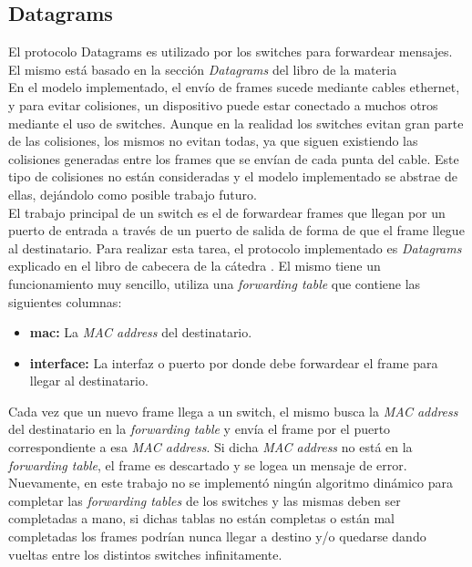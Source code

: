 \documentclass[10pt,a4paper]{article}
\begin{document}
\subsection{Datagrams}
El protocolo Datagrams es utilizado por los switches para forwardear mensajes. El mismo está basado en la sección \textit{Datagrams} del libro de la materia \cite[p.~172]{peterson2011computer} \\

En el modelo implementado, el envío de frames sucede mediante cables ethernet, y para evitar colisiones, un dispositivo puede estar conectado a muchos otros mediante el uso de switches. Aunque en la realidad los switches evitan gran parte de las colisiones, los mismos no evitan todas, ya que siguen existiendo las colisiones generadas entre los frames que se envían de cada punta del cable. Este tipo de colisiones no están consideradas y el modelo implementado se abstrae de ellas, dejándolo como posible trabajo futuro. \\

El trabajo principal de un switch es el de forwardear frames que llegan por un puerto de entrada a través de un puerto de salida de forma de que el frame llegue al destinatario. Para realizar esta tarea, el protocolo implementado es \textit{Datagrams} explicado en el libro de cabecera de la cátedra \cite[p.~172]{peterson2011computer}. El mismo tiene un funcionamiento muy sencillo, utiliza una \textit{forwarding table} que contiene las siguientes columnas: \\

\begin{itemize}
\item \textbf{mac: } La \textit{MAC address} del destinatario.
\item \textbf{interface: } La interfaz o puerto por donde debe forwardear el frame para llegar al destinatario.
\end{itemize}

Cada vez que un nuevo frame llega a un switch, el mismo busca la \textit{MAC address} del destinatario en la \textit{forwarding table} y envía el frame por el puerto correspondiente a esa \textit{MAC address}. Si dicha \textit{MAC address} no está en la \textit{forwarding table}, el frame es descartado y se logea un mensaje de error. \\

Nuevamente, en este trabajo no se implementó ningún algoritmo dinámico para completar las \textit{forwarding tables} de los switches y las mismas deben ser completadas a mano, si dichas tablas no están completas o están mal completadas los frames podrían nunca llegar a destino y/o quedarse dando vueltas entre los distintos switches infinitamente. \\
\end{document}

